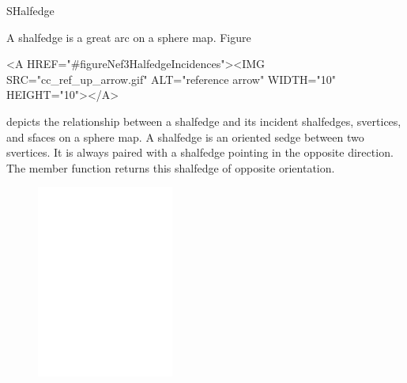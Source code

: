 
\ccRefPageBegin



\begin{ccRefClass}{SHalfedge}

\ccDefinition

A shalfedge is a great arc on a sphere map. 
Figure~\begin{ccHtmlOnly}
  <A HREF="#figureNef3HalfedgeIncidences"><IMG 
  SRC="cc_ref_up_arrow.gif" ALT="reference arrow" WIDTH="10" HEIGHT="10"></A>
\end{ccHtmlOnly}
depicts the relationship between a shalfedge and its incident
shalfedges, svertices, and sfaces on a sphere map.  A shalfedge is 
an oriented sedge between two svertices. It is always paired with a 
shalfedge pointing in
the opposite direction. The  member function returns
this shalfedge of opposite orientation.

\begin{ccTexOnly}
    \begin{figure}[bht]
        \begin{center}
          \parbox{0.4\textwidth}{%
              \includegraphics[width=0.4\textwidth]{Nef_3/fig/shalfedge}%
          }
        \end{center}
        \label{figureNef3HalfedgeIncidences}
    \end{figure}
\end{ccTexOnly}


\end{ccRefClass}
